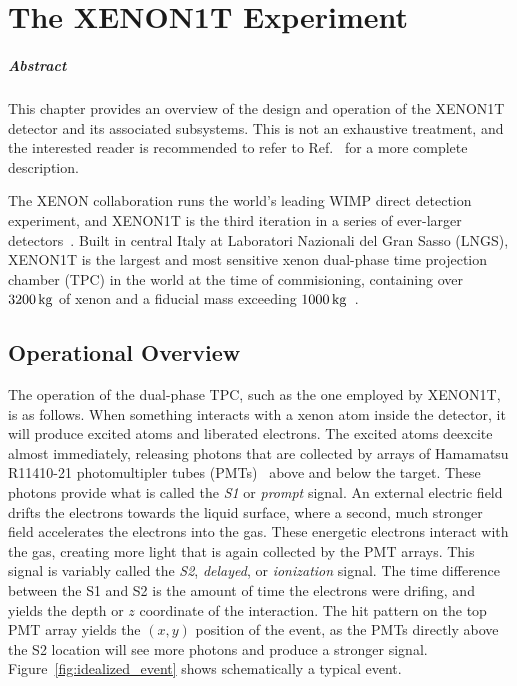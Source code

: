 
\chapter{The XENON1T Experiment}

\paragraph{Abstract} This chapter provides an overview of the design and operation of the XENON1T detector and its associated subsystems. This is not an exhaustive treatment, and the interested reader is recommended to refer to Ref.~\cite{Aprile:2017aty} for a more complete description.

The XENON collaboration runs the world's leading WIMP direct detection experiment, and XENON1T is the third iteration in a series of ever-larger detectors~\cite{Angle:2007uj,Aprile:2011dd}. Built in central Italy at Laboratori Nazionali del Gran Sasso (LNGS), XENON1T is the largest and most sensitive xenon dual-phase time projection chamber (TPC) in the world at the time of commisioning, containing over $3200\,\mathrm{kg}$ of xenon and a fiducial mass exceeding $1000\,\mathrm{kg}$~\cite{Aprile:2017iyp}.

\section{Operational Overview}

The operation of the dual-phase TPC, such as the one employed by XENON1T, is as follows. When something interacts with a xenon atom inside the detector, it will produce excited atoms and liberated electrons. The excited atoms deexcite almost immediately, releasing photons that are collected by arrays of Hamamatsu R11410-21 photomultipler tubes (PMTs)~\cite{Aprile:2015lha} above and below the target. These photons provide what is called the \textit{S1} or \textit{prompt} signal. An external electric field drifts the electrons towards the liquid surface, where a second, much stronger field accelerates the electrons into the gas. These energetic electrons interact with the gas, creating more light that is again collected by the PMT arrays. This signal is variably called the \textit{S2}, \textit{delayed}, or \textit{ionization} signal. The time difference between the S1 and S2 is the amount of time the electrons were drifing, and yields the depth or $z$ coordinate of the interaction. The hit pattern on the top PMT array yields the $(x,y)$ position of the event, as the PMTs directly above the S2 location will see more photons and produce a stronger signal. Figure~\ref{fig:idealized_event} shows schematically a typical event.

